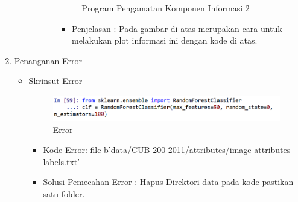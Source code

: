 \begin{enumerate}
\begin{itemize}
\begin{itemize}
\begin{itemize}
\begin{figure}[ht]
\caption{Program Pengamatan Komponen Informasi 2}
\label{contoh}
\end{figure}
\par
\begin{itemize}
\item Penjelasan : Pada gambar di atas merupakan cara untuk  melakukan plot informasi ini dengan kode di atas.
\par 
\par
\end{itemize}
\end{itemize}
\end{itemize}
\end{itemize}

\item Penanganan Error
\begin{itemize}
\item Skrinsut Error
\par
\begin{figure}[ht]
\centering
\includegraphics[scale=0.7]{figures/andi/elor.PNG}
\caption{Error}
\label{contoh}
\end{figure}
\par
\begin{itemize}
\item Kode Error: file b'data/CUB 200 2011/attributes/image attributes labels.txt'
\par 
\item Solusi Pemecahan Error : Hapus Direktori data pada kode pastikan satu folder.
\par 
\par
\end{itemize}
\end{itemize}

\end{enumerate}
